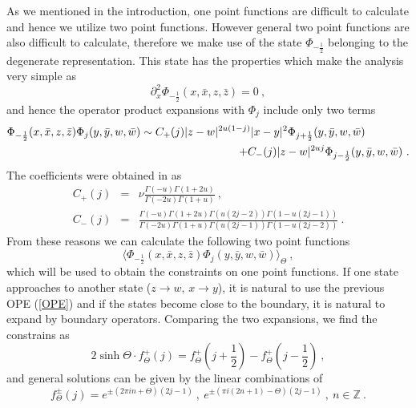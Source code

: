 \documentclass[a4paper,12pt]{article}
\newcommand{\bz}{\mathbb Z}
\newcommand{\nn}{\nonumber\\}
\begin{document}
As we mentioned in the introduction, one point functions are difficult to
calculate and hence we utilize two point functions.
However general two point functions are also difficult to calculate,
therefore we make use of the state
$\Phi_{-\frac{1}{2}}$ belonging to the degenerate representation.
This state has the properties which make the analysis very simple as
\begin{equation}
 \partial^2 _x \Phi_{- \frac{1}{2}} (x,\bar{x},z,\bar{z}) = 0 ~,
\label{der}
\end{equation}
and hence the operator product expansions with $\Phi_j$ include only two
terms 
\begin{eqnarray}
 \lefteqn{
 \Phi_{-\frac{1}{2}} (x, \bar{x} ,z ,\bar{z}) 
 \Phi_j (y, \bar{y} ,w, \bar{w})
  \sim C_+ (j) |z-w|^{2u(1-j)} |x - y |^2 
  \Phi_{j+\frac{1}{2}}  (y, \bar{y} ,w, \bar{w})} \nn
  && \hspace{7cm} 
   + C_- (j) |z-w|^{2uj} \Phi_{j-\frac{1}{2}} (y, \bar{y} ,w, \bar{w}) ~.  
\label{OPE}
\end{eqnarray} 
The coefficients were obtained in \cite{Teschner} as
\begin{eqnarray}
 C_+ (j) &=&
  \nu \frac{\Gamma ( -u) \Gamma (1 +2u)}{\Gamma ( -2u) \Gamma ( 1 +u )} ~,\nn
 C_- (j) &=& 
   \frac{\Gamma ( -u) \Gamma ( 1 +2u ) \Gamma ( u(2j-2)) \Gamma (1-u(2j-1))}
   {\Gamma ( -2u) \Gamma ( 1 +u ) \Gamma ( u(2j-1)) \Gamma (1-u(2j-2))} ~.
\label{cpm} 
\end{eqnarray}
From these reasons we can calculate the following two point functions
\begin{equation}
 \langle \Phi_{-\frac{1}{2}} (x,\bar{x},z,\bar{z}) 
  \Phi_{j} (y,\bar{y},w,\bar{w}) 
 \rangle_{\Theta} ~,
\end{equation}
which will be used to obtain the constraints on one point functions.
If one state approaches to another state ($z \to w$, $x \to y$), 
it is natural to use the previous 
OPE (\ref{OPE}) and if the states become close to the boundary, it is
natural to expand by boundary operators.
Comparing the two expansions, we find the constrains as
\begin{equation}
 2 \sinh \Theta \cdot f^+_{\Theta} (j) =
  f^+ _{\Theta}(j + \textstyle \frac{1}{2}) 
 - f^+ _{\Theta}(j - \textstyle \frac{1}{2}) ~,
\end{equation}  
and general solutions can be given by the linear combinations of
\begin{equation}
 f^{\pm}_{\Theta} (j) = e^{\pm (2 \pi i n + \Theta) (2j -1)} ~,~
  e^{\pm (\pi i (2n+1) - \Theta) (2j -1)} ~,~ n \in \bz ~.
\end{equation} 
\end{document}
